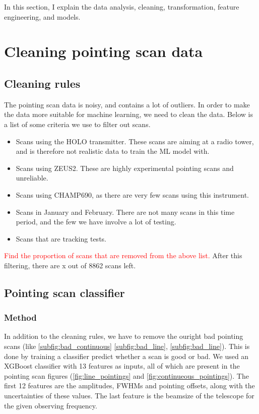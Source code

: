 In this section, I explain the data analysis, cleaning, transformation, feature engineering, and models.

\section{Cleaning pointing scan data}
\subsection{Cleaning rules}
The pointing scan data is noisy, and contains a lot of outliers.
In order to make the data more suitable for machine learning, we need to clean the data.
Below is a list of some criteria we use to filter out scans.
\begin{itemize}
    \item Scans using the HOLO transmitter.
    These scans are aiming at a radio tower, and is therefore not realistic data to train the ML model with.
    \item Scans using ZEUS2.
    These are highly experimental pointing scans and unreliable.
    \item Scans using CHAMP690, as there are very few scans using this instrument.
    \item Scans in January and February.
    There are not many scans in this time period, and the few we have involve a lot of testing.
    \item Scans that are tracking tests.
\end{itemize}   
\textcolor{red}{Find the proportion of scans that are removed from the above list.}
After this filtering, there are x out of 8862 scans left.
        
\subsection{Pointing scan classifier}
\subsubsection{Method}
In addition to the cleaning rules, we have to remove the ouright bad pointing scans (like \ref{subfig:bad_continuous} \ref{subfig:bad_line}, \ref{subfig:bad_line}).
This is done by training a classifier predict whether a scan is good or bad.
We used an XGBoost classifier with 13 features as inputs, all of which are present in the pointing scan figures (\ref{fig:line_pointings} and \ref{fig:continueous_pointings}).
The first 12 features are the amplitudes, FWHMs and pointing offsets, along with the uncertainties of these values.
The last feature is the beamsize of the telescope for the given observing frequency.\\


